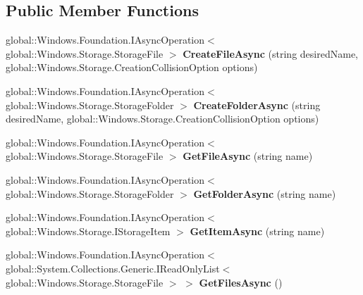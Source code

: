 \subsection*{Public Member Functions}
\begin{DoxyCompactItemize}
\item 
\mbox{\label{class_windows_1_1_storage_1_1_storage_folder_a1148f0c45b571856ab96a2bf97e2dd87}} 
global\+::\+Windows.\+Foundation.\+I\+Async\+Operation$<$ global\+::\+Windows.\+Storage.\+Storage\+File $>$ {\bfseries Create\+File\+Async} (string desired\+Name, global\+::\+Windows.\+Storage.\+Creation\+Collision\+Option options)
\item 
\mbox{\label{class_windows_1_1_storage_1_1_storage_folder_ad7abc9e33097dc2a8e60d66d76e5558c}} 
global\+::\+Windows.\+Foundation.\+I\+Async\+Operation$<$ global\+::\+Windows.\+Storage.\+Storage\+Folder $>$ {\bfseries Create\+Folder\+Async} (string desired\+Name, global\+::\+Windows.\+Storage.\+Creation\+Collision\+Option options)
\item 
\mbox{\label{class_windows_1_1_storage_1_1_storage_folder_a3766a445bb3e86f2bf570d83084bb729}} 
global\+::\+Windows.\+Foundation.\+I\+Async\+Operation$<$ global\+::\+Windows.\+Storage.\+Storage\+File $>$ {\bfseries Get\+File\+Async} (string name)
\item 
\mbox{\label{class_windows_1_1_storage_1_1_storage_folder_abb723045c2ef18ea0a93b5788948994c}} 
global\+::\+Windows.\+Foundation.\+I\+Async\+Operation$<$ global\+::\+Windows.\+Storage.\+Storage\+Folder $>$ {\bfseries Get\+Folder\+Async} (string name)
\item 
\mbox{\label{class_windows_1_1_storage_1_1_storage_folder_ac931af40aac04b2aff19610399dbae2e}} 
global\+::\+Windows.\+Foundation.\+I\+Async\+Operation$<$ global\+::\+Windows.\+Storage.\+I\+Storage\+Item $>$ {\bfseries Get\+Item\+Async} (string name)
\item 
\mbox{\label{class_windows_1_1_storage_1_1_storage_folder_a03d5948527bd8ff44b485ba99e4fd723}} 
global\+::\+Windows.\+Foundation.\+I\+Async\+Operation$<$ global\+::\+System.\+Collections.\+Generic.\+I\+Read\+Only\+List$<$ global\+::\+Windows.\+Storage.\+Storage\+File $>$ $>$ {\bfseries Get\+Files\+Async} ()

\end{DoxyCompactItemize}
